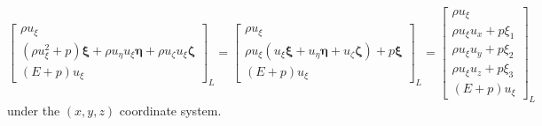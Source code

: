 \documentclass{report}
\begin{document}
\begin{appendices}
\begin{equation*}
    \begin{bmatrix}
    \rho u_\xi \\
    (\rho u_\xi^2 + p)\bm{\xi} + \rho u_\eta u_\xi \bm{\eta} + \rho u_\zeta u_\xi \bm{\zeta}\\
    (E + p)u_\xi
    \end{bmatrix}_L
    = 
    \begin{bmatrix}
    \rho u_\xi \\
    \rho u_\xi(u_\xi\bm{\xi} + u_\eta\bm{\eta} + u_\zeta\bm{\zeta}) + p\bm{\xi}\\
    (E + p)u_\xi
    \end{bmatrix}_L
    = 
    \begin{bmatrix}
    \rho u_\xi \\
    \rho u_\xi u_x + p\xi_1\\
    \rho u_\xi u_y + p\xi_2\\
    \rho u_\xi u_z + p\xi_3\\
    (E + p)u_\xi
    \end{bmatrix}_L
\end{equation*}
under the $(x,y,z)$ coordinate system.


\end{appendices}
\end{document}
